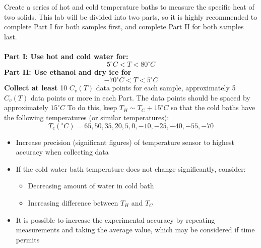 \documentclass[12pt]{report}
\begin{document}
	Create a series of hot and cold temperature baths to measure the specific heat of two solids. 
This lab will be divided into two parts, so it is highly recommended to complete Part I for both samples first, and complete
 Part II for both samples last.\\
\\
\textbf{Part I: Use hot and cold water for:}
	\[ 5^{\circ}C < T < 80^{\circ}C\]
\textbf{Part II: Use ethanol and dry ice for}
	\[-70^{\circ}C<T<5^{\circ}C\]
\textbf{Collect at least} 10 $C_v(T)$ data points for each sample, approximately 5 $C_v(T)$ data points or more
in each Part. The data points should be spaced by approximately $15^{\circ}C$ To do this, keep $T_H \sim T_C+15^{\circ}C$
 so that the cold baths have the following temperatures (or similar temperatures):
\[T_c(^{\circ}C) = 65, 50, 35,20,5,0,-10,-25,-40,-55,-70\]
\begin{itemize}
	\item Increase precision (significant figures) of temperature sensor to highest accuracy when collecting data
	\item If the cold water bath temperature does not change significantly, consider:
	\begin{itemize}
		\item Decreasing amount of water in cold bath
		\item Increasing difference between $T_H$ and $T_C$
	\end{itemize}
	\item It is possible to increase the experimental accuracy by repeating measurements and taking the average value, 
which may be considered if time permits
\end{itemize}
\end{document}
